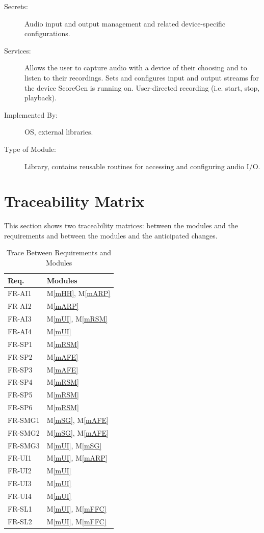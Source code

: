 \documentclass[12pt, titlepage]{article}
\newcommand{\mref}[1]{M\ref{#1}}
\begin{document}
\begin{description}
\item[Secrets:] Audio input and output management and related device-specific configurations.
\item[Services:] Allows the user to capture audio with a device of their choosing and to listen to their recordings.
  Sets and configures input and output streams for the device ScoreGen is running on.
  User-directed recording (i.e. start, stop, playback).
\item[Implemented By:] OS, external libraries.
\item[Type of Module:] Library, contains reusable routines for accessing and configuring audio I/O.
\end{description}

\section{Traceability Matrix} \label{SecTM}

This section shows two traceability matrices: between the modules and the
requirements and between the modules and the anticipated changes.

\begin{table}[H]
\centering
\begin{tabular}{p{} p{}}
\toprule
\textbf{Req.} & \textbf{Modules}\\
\midrule
FR-AI1 & \mref{mHH}, \mref{mARP}\\
FR-AI2 & \mref{mARP}\\
FR-AI3 & \mref{mUI}, \mref{mRSM}\\
FR-AI4 & \mref{mUI}\\
FR-SP1 & \mref{mRSM}\\
FR-SP2 & \mref{mAFE}\\
FR-SP3 & \mref{mAFE}\\
FR-SP4 & \mref{mRSM}\\
FR-SP5 & \mref{mRSM}\\
FR-SP6 & \mref{mRSM}\\
FR-SMG1 & \mref{mSG}, \mref{mAFE}\\
FR-SMG2 & \mref{mSG}, \mref{mAFE}\\
FR-SMG3 & \mref{mUI}, \mref{mSG}\\
FR-UI1 & \mref{mUI}, \mref{mARP}\\
FR-UI2 & \mref{mUI}\\
FR-UI3 & \mref{mUI}\\
FR-UI4 & \mref{mUI}\\
FR-SL1 & \mref{mUI}, \mref{mFFC}\\
FR-SL2 & \mref{mUI}, \mref{mFFC}\\
\bottomrule
\end{tabular}
\caption{Trace Between Requirements and Modules}
\label{TblRT}
\end{table}
\end{document}
